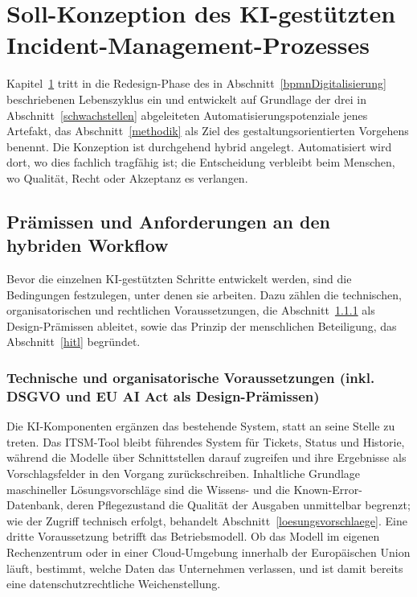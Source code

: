 \section{Soll-Konzeption des KI-gestützten Incident-Management-Prozesses}
\label{sollKonzeption}

Kapitel~\ref{sollKonzeption} tritt in die Redesign-Phase des in Abschnitt~\ref{bpmnDigitalisierung} beschriebenen Lebenszyklus ein und entwickelt auf Grundlage der drei in Abschnitt~\ref{schwachstellen} abgeleiteten Automatisierungspotenziale jenes Artefakt, das Abschnitt~\ref{methodik} als Ziel des gestaltungsorientierten Vorgehens benennt. Die Konzeption ist durchgehend hybrid angelegt. Automatisiert wird dort, wo dies fachlich tragf\"ahig ist; die Entscheidung verbleibt beim Menschen, wo Qualit\"at, Recht oder Akzeptanz es verlangen.

\subsection{Prämissen und Anforderungen an den hybriden Workflow}
\label{praemissen}

Bevor die einzelnen KI-gest\"utzten Schritte entwickelt werden, sind die Bedingungen festzulegen, unter denen sie arbeiten. Dazu z\"ahlen die technischen, organisatorischen und rechtlichen Voraussetzungen, die Abschnitt~\ref{voraussetzungen} als Design-Pr\"amissen ableitet, sowie das Prinzip der menschlichen Beteiligung, das Abschnitt~\ref{hitl} begr\"undet.

\subsubsection{Technische und organisatorische Voraussetzungen (inkl. DSGVO und EU AI Act als Design-Prämissen)}
\label{voraussetzungen}

Die KI-Komponenten erg\"anzen das bestehende System, statt an seine Stelle zu treten. Das ITSM-Tool bleibt f\"uhrendes System f\"ur Tickets, Status und Historie, w\"ahrend die Modelle \"uber Schnittstellen darauf zugreifen und ihre Ergebnisse als Vorschlagsfelder in den Vorgang zur\"uckschreiben. Inhaltliche Grundlage maschineller L\"osungsvorschl\"age sind die Wissens- und die Known-Error-Datenbank, deren Pflegezustand die Qualit\"at der Ausgaben unmittelbar begrenzt; wie der Zugriff technisch erfolgt, behandelt Abschnitt~\ref{loesungsvorschlaege}. Eine dritte Voraussetzung betrifft das Betriebsmodell. Ob das Modell im eigenen Rechenzentrum oder in einer Cloud-Umgebung innerhalb der Europ\"aischen Union l\"auft, bestimmt, welche Daten das Unternehmen verlassen, und ist damit bereits eine datenschutzrechtliche Weichenstellung.


